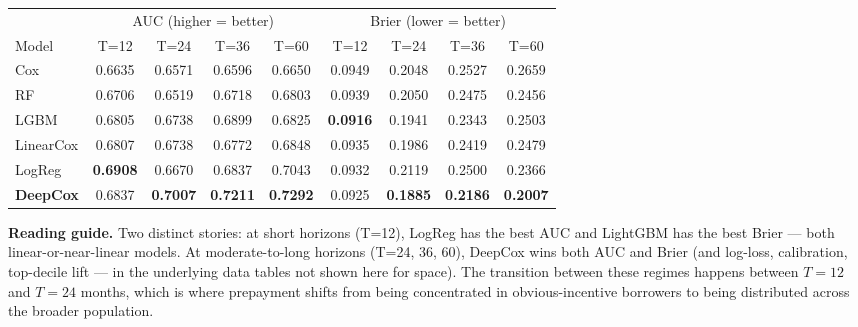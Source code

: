 \documentclass[11pt,a4paper]{article}
\begin{document}
\begin{center}
  \small
  \begin{tabular}{lcccc|cccc}
    \toprule
                     & \multicolumn{4}{c|}{AUC (higher = better)} & \multicolumn{4}{c}{Brier (lower = better)}                                                                                                             \\
    Model            & T=12                                       & T=24                                       & T=36            & T=60            & T=12            & T=24            & T=36            & T=60            \\
    \midrule
    Cox              & 0.6635                                     & 0.6571                                     & 0.6596          & 0.6650          & 0.0949          & 0.2048          & 0.2527          & 0.2659          \\
    RF               & 0.6706                                     & 0.6519                                     & 0.6718          & 0.6803          & 0.0939          & 0.2050          & 0.2475          & 0.2456          \\
    LGBM             & 0.6805                                     & 0.6738                                     & 0.6899          & 0.6825          & \textbf{0.0916} & 0.1941          & 0.2343          & 0.2503          \\
    LinearCox        & 0.6807                                     & 0.6738                                     & 0.6772          & 0.6848          & 0.0935          & 0.1986          & 0.2419          & 0.2479          \\
    LogReg           & \textbf{0.6908}                            & 0.6670                                     & 0.6837          & 0.7043          & 0.0932          & 0.2119          & 0.2500          & 0.2366          \\
    \textbf{DeepCox} & 0.6837                                     & \textbf{0.7007}                            & \textbf{0.7211} & \textbf{0.7292} & 0.0925          & \textbf{0.1885} & \textbf{0.2186} & \textbf{0.2007} \\
    \bottomrule
  \end{tabular}
\end{center}

\textbf{Reading guide.} Two distinct stories: at short horizons (T=12), LogReg has the best AUC and LightGBM has the best Brier --- both linear-or-near-linear models. At moderate-to-long horizons (T=24, 36, 60), DeepCox wins both AUC and Brier (and log-loss, calibration, top-decile lift --- in the underlying data tables not shown here for space). The transition between these regimes happens between $T{=}12$ and $T{=}24$ months, which is where prepayment shifts from being concentrated in obvious-incentive borrowers to being distributed across the broader population.
\end{document}
